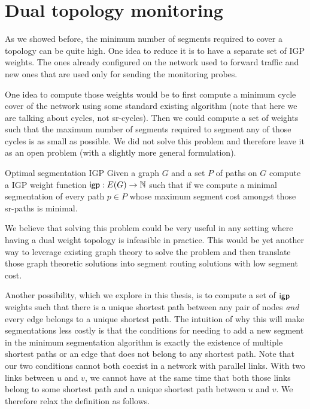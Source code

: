 \section{Dual topology monitoring}
\label{section:complete-igp}

As we showed before, the minimum number of segments required to cover a topology can be quite high.
One idea to reduce it is to have a separate set of IGP weights. The ones already configured on the network used
to forward traffic and new ones that are used only for sending the monitoring probes.

One idea to compute those weights would be to first compute a minimum cycle cover of the network using
some standard existing algorithm \cite{FAN1992113} (note that here we are talking about cycles, not 
sr-cycles). Then we could compute a set of weights such that the maximum number of segments required to
segment any of those cycles is as small as possible. We did not solve this problem and therefore leave
it as an open problem (with a slightly more general formulation).

\begin{problem}{Optimal segmentation IGP}
Given a graph $G$ and a set $P$ of paths on $G$ compute a IGP weight function 
$\mathsf{igp} : E(G) \rightarrow \mathbb{N}$ such that if we compute a minimal segmentation
of every path $p \in P$ whose maximum segment cost amongst those sr-paths is minimal.
\end{problem}

We believe that solving this problem could be very useful in any setting where having a dual weight
topology is infeasible in practice. This would be yet another way to leverage existing graph theory to solve the 
problem and then translate those graph theoretic solutions into segment routing solutions with low
segment cost.

Another possibility, which we explore in this thesis, is to compute a set of $\mathsf{igp}$ weights such that 
there is a unique shortest path between any pair of nodes \emph{and} every edge belongs to a unique shortest
path. The intuition of why this will make segmentations less costly is that the conditions for needing to add
a new segment in the minimum segmentation algorithm is exactly the existence of multiple shortest paths or
an edge that does not belong to any shortest path.
Note that our two conditions cannot both coexist in a network with parallel links. With two links between
$u$ and $v$, we cannot have at the same time that both those links belong to some shortest path and a unique
shortest path between $u$ and $v$. We therefore relax the definition as follows.

